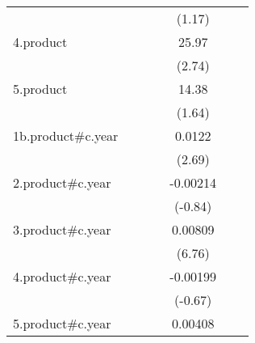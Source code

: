 {\begin{tabular}{l*{6}{c}}
                    &                     &                     &                     &      (1.17)         &                     &                     \\
[1em]
4.product           &                     &                     &                     &       25.97\sym{**} &                     &                     \\
                    &                     &                     &                     &      (2.74)         &                     &                     \\
[1em]
5.product           &                     &                     &                     &       14.38         &                     &                     \\
                    &                     &                     &                     &      (1.64)         &                     &                     \\
[1em]
1b.product#c.year   &                     &                     &                     &      0.0122\sym{**} &                     &                     \\
                    &                     &                     &                     &      (2.69)         &                     &                     \\
[1em]
2.product#c.year    &                     &                     &                     &    -0.00214         &                     &                     \\
                    &                     &                     &                     &     (-0.84)         &                     &                     \\
[1em]
3.product#c.year    &                     &                     &                     &     0.00809\sym{***}&                     &                     \\
                    &                     &                     &                     &      (6.76)         &                     &                     \\
[1em]
4.product#c.year    &                     &                     &                     &    -0.00199         &                     &                     \\
                    &                     &                     &                     &     (-0.67)         &                     &                     \\
[1em]
5.product#c.year    &                     &                     &                     &     0.00408\sym{*}  &                     &                     \\

\end{tabular}}
